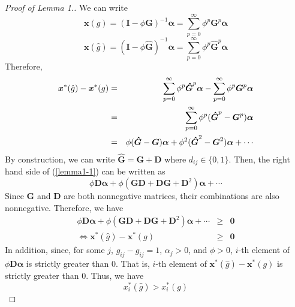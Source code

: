 \documentclass[12pt]{article}
\theoremstyle{definition}
\newcommand{\bm}[1]{\boldsymbol{#1}}
\begin{document}
\begin{proof}[Proof of Lemma 1.]
	We can write
	\[ \bm{x}(g) = {(\bm{I} - \phi \bm{G})}^{-1} \bm{\alpha} = \sum_{p=0}^{\infty} \phi^p \bm{G}^p \bm{\alpha} \]
	\[ \bm{x}(\hat{g}) = {(\bm{I} - \phi \bm{\hat{G}})}^{-1} \bm{\alpha} = \sum_{p=0}^{\infty} \phi^p \bm{\hat{G}}^p \bm{\alpha} \]
	Therefore,
	\begin{eqnarray}
		\label{lemma1-1}
		\bm{x}^*(\hat{g}) - \bm{x}^*(g) &=& \sum_{p=0}^{\infty} \phi^p \bm{\hat{G}}^p \bm{\alpha} - \sum_{p=0}^{\infty} \phi^p \bm{G}^p \bm{\alpha} \notag \\
										&=& \sum_{p=0}^{\infty} \phi^p (\bm{\hat{G}}^p - \bm{G}^p) \bm{\alpha} \notag \\
										&=& \phi (\bm{\hat{G}} - \bm{G}) \bm{\alpha} + \phi^2 (\bm{\hat{G}}^2 - \bm{G}^2) \bm{\alpha} + \cdots
	\end{eqnarray}
	By construction, we can write $\bm{\hat{G}} = \bm{G} + \bm{D}$ where $d_{ij} \in \{0,1\}$.
	Then, the right hand side of (\ref{lemma1-1}) can be written as
	\[ \phi \bm{D} \bm{\alpha} + \phi (\bm{G} \bm{D} + \bm{D} \bm{G} + \bm{D}^2) \bm{\alpha} + \cdots \]
	Since $\bm{G}$ and $\bm{D}$ are both nonnegative matrices, their combinations are also nonnegative.
	Therefore, we have
	\begin{eqnarray*}
		\phi \bm{D} \bm{\alpha} + \phi (\bm{G} \bm{D} + \bm{D} \bm{G} + \bm{D}^2) \bm{\alpha} + \cdots &\ge& \bm{0} \\
		\Leftrightarrow \bm{x}^*(\hat{g}) - \bm{x}^*(g) &\ge& \bm{0}
	\end{eqnarray*}
	In addition, since, for some $j$, $\hat{g}_{ij} - g_{ij} = 1$, $\alpha_j > 0$, and $\phi > 0$, $i$-th element of $\phi \bm{D} \bm{\alpha}$ is strictly greater than $0$.
	That is, $i$-th element of $\bm{x}^*(\hat{g}) - \bm{x}^*(g)$ is strictly greater than $0$.
	Thus, we have
	\[ x_i^*(\hat{g}) > x_i^*(g) \]
\end{proof}
\end{document}

